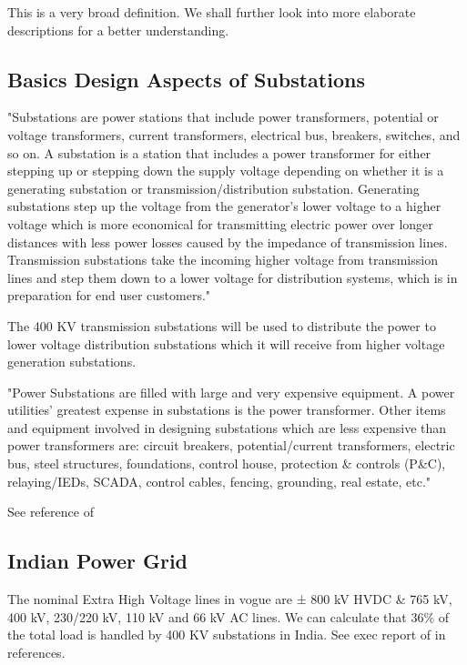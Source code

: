 \documentclass[11pt, a4paper]{article} %
\begin{document}
This is a very broad definition. We shall further look into more elaborate descriptions for a better understanding.

\subsection{Basics Design Aspects of Substations}
"Substations are power stations that include power transformers, potential or voltage transformers, current transformers, electrical bus, breakers, switches, and so on.  A substation is a station that includes a power transformer for either stepping up or stepping down the supply voltage depending on whether it is a generating substation or transmission/distribution substation. Generating substations step up the voltage from the generator’s lower voltage to a higher voltage which is more economical for transmitting electric power over longer distances with less power losses caused by the impedance of transmission lines. Transmission substations take the incoming higher voltage from transmission lines and step them down to a lower voltage for distribution systems, which is in preparation for end user customers."

The 400 KV transmission substations will be used to distribute the power to lower voltage distribution substations which it will receive from higher voltage generation substations. 

"Power Substations are filled with large and very expensive equipment. A power utilities’ greatest expense in substations is the power transformer. Other items and equipment involved in designing substations which are less expensive than power transformers are: circuit breakers, potential/current transformers, electric bus, steel structures, foundations, control house, protection \& controls (P\&C), relaying/IEDs, SCADA, control cables, fencing, grounding, real estate, etc."

See reference of \citet{basics-of-power-substations}

\subsection{Indian Power Grid} %
The nominal Extra High Voltage lines in vogue are ± 800 kV HVDC \& 765 kV, 400 kV, 230/220 kV, 110 kV and 66 kV AC lines. We can calculate that 36\% of the total load is handled by 400 KV substations in India. See exec report of \citet{execsummary2020} in references.

\end{document}
